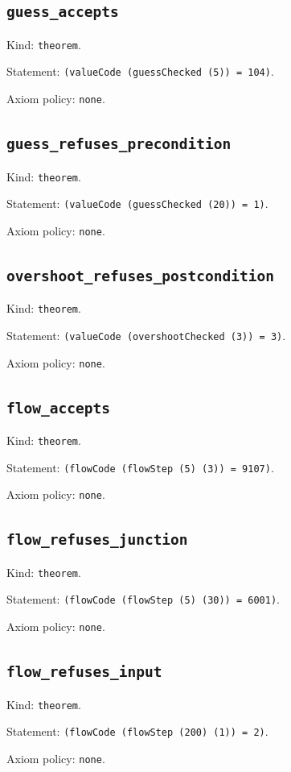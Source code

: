 \documentclass[11pt]{article}
\begin{document}
\subsection*{\texttt{guess\_accepts}}
\noindent Kind: \texttt{theorem}.\par
\noindent Statement: \texttt{(valueCode (guessChecked (5)) = 104)}.\par
\noindent Axiom policy: \texttt{none}.\par
\subsection*{\texttt{guess\_refuses\_precondition}}
\noindent Kind: \texttt{theorem}.\par
\noindent Statement: \texttt{(valueCode (guessChecked (20)) = 1)}.\par
\noindent Axiom policy: \texttt{none}.\par
\subsection*{\texttt{overshoot\_refuses\_postcondition}}
\noindent Kind: \texttt{theorem}.\par
\noindent Statement: \texttt{(valueCode (overshootChecked (3)) = 3)}.\par
\noindent Axiom policy: \texttt{none}.\par
\subsection*{\texttt{flow\_accepts}}
\noindent Kind: \texttt{theorem}.\par
\noindent Statement: \texttt{(flowCode (flowStep (5) (3)) = 9107)}.\par
\noindent Axiom policy: \texttt{none}.\par
\subsection*{\texttt{flow\_refuses\_junction}}
\noindent Kind: \texttt{theorem}.\par
\noindent Statement: \texttt{(flowCode (flowStep (5) (30)) = 6001)}.\par
\noindent Axiom policy: \texttt{none}.\par
\subsection*{\texttt{flow\_refuses\_input}}
\noindent Kind: \texttt{theorem}.\par
\noindent Statement: \texttt{(flowCode (flowStep (200) (1)) = 2)}.\par
\noindent Axiom policy: \texttt{none}.\par
\end{document}
